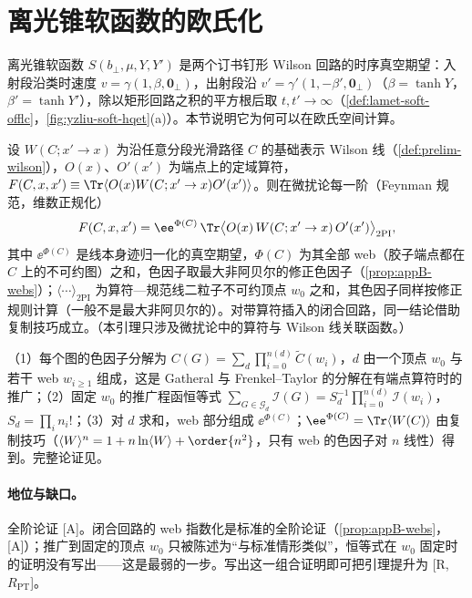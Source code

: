 \section{离光锥软函数的欧氏化}\label{sec:yzliu-soft}

离光锥软函数 $S(b_\perp,\mu,Y,Y')$ 是两个订书钉形 Wilson 回路的时序真空期望：入射段沿类时速度 $v=\gamma(1,\beta,\mathbf 0_\perp)$，出射段沿 $v'=\gamma'(1,-\beta',\mathbf 0_\perp)$（$\beta=\tanh Y$，$\beta'=\tanh Y'$），除以矩形回路之积的平方根后取 $t,t'\to\infty$（\cref{def:lamet-soft-offlc}，\cref{fig:yzliu-soft-hqet}(a)）。本节说明它为何可以在欧氏空间计算。


\begin{lemma}\label{lem:yzliu-partial-exp}
设 $W(C;x'\to x)$ 为沿任意分段光滑路径 $C$ 的基础表示 Wilson 线（\cref{def:prelim-wilson}），$O(x)$、$O'(x')$ 为端点上的定域算符，$F(C,x,x')\equiv\Tr\langle O(x)W(C;x'\to x)O'(x')\rangle$。则在微扰论每一阶（Feynman 规范，维数正规化）
\begin{equation}\label{eq:yzliu-partial-exp}
F(C,x,x')=\ee^{\Phi(C)}\,\Tr\big\langle O(x)\,W(C;x'\to x)\,O'(x')\big\rangle_{\mathrm{2PI}} ,
\end{equation}
其中 $\ee^{\Phi(C)}$ 是线本身迹归一化的真空期望，$\Phi(C)$ 为其全部 web（胶子端点都在 $C$ 上的不可约图）之和，色因子取最大非阿贝尔的修正色因子（\cref{prop:appB-webs}）；$\langle\cdots\rangle_{\mathrm{2PI}}$ 为算符—规范线二粒子不可约顶点 $w_0$ 之和，其色因子同样按修正规则计算（一般不是最大非阿贝尔的）。对带算符插入的闭合回路，同一结论借助复制技巧成立。（本引理只涉及微扰论中的算符与 Wilson 线关联函数。）
\end{lemma}

\begin{proofsketch}
（1）每个图的色因子分解为 $C(G)=\sum_{d}\prod_{i=0}^{n(d)}\tilde C(w_i)$，$d$ 由一个顶点 $w_0$ 与若干 web $w_{i\ge1}$ 组成，这是 Gatheral 与 Frenkel--Taylor 的分解\cite{Gatheral1983,FrenkelTaylor1984}在有端点算符时的推广；（2）固定 $w_0$ 的推广程函恒等式 $\sum_{G\in\mathcal G_d}\mathcal I(G)=S_d^{-1}\prod_{i=0}^{n(d)}\mathcal I(w_i)$，$S_d=\prod_in_i!$\cite[式~(B.5)]{Liu:2022nnk}；（3）对 $d$ 求和，web 部分组成 $\ee^{\Phi(C)}$；$\ee^{\Phi(C)}=\Tr\langle W(C)\rangle$ 由复制技巧（$\langle W\rangle^n=1+n\ln\langle W\rangle+\order{n^2}$，只有 web 的色因子对 $n$ 线性）得到。完整论证见\cite[第~3.2~节与附录~B]{Liu:2022nnk}。
\end{proofsketch}

\paragraph{地位与缺口。}全阶论证 [A]。闭合回路的 web 指数化是标准的全阶论证（\cref{prop:appB-webs}，[A]）；推广到固定的顶点 $w_0$ 只被陈述为“与标准情形类似”，恒等式在 $w_0$ 固定时的证明没有写出\cite[附录~B]{Liu:2022nnk}——这是最弱的一步。写出这一组合证明即可把引理提升为 [R, $R_{\mathrm{PT}}$]。


